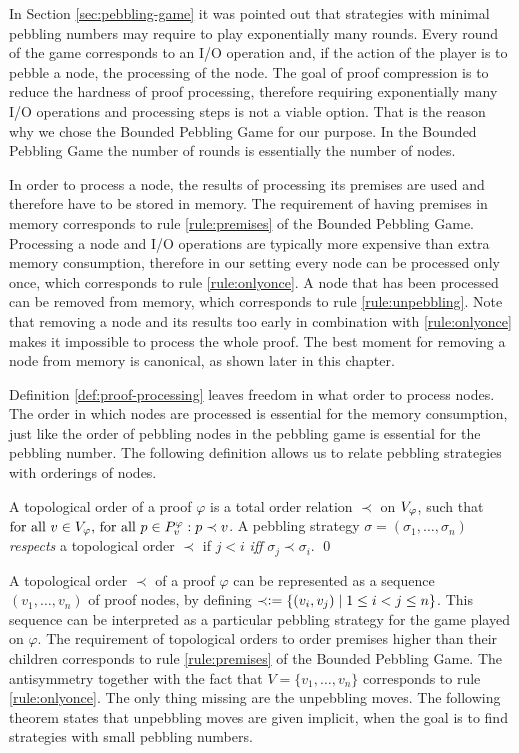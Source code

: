 In Section \ref{sec:pebbling-game} it was pointed out that strategies with minimal pebbling numbers may require to play exponentially many rounds.
Every round of the game corresponds to an I/O operation and, if the action of the player is to pebble a node, the processing of the node.
The goal of proof compression is to reduce the hardness of proof processing, therefore requiring exponentially many I/O operations and processing steps is not a viable option.
That is the reason why we chose the Bounded Pebbling Game for our purpose.
In the Bounded Pebbling Game the number of rounds is essentially the number of nodes.

In order to process a node, the results of processing its premises are used and therefore have to be stored in memory.
The requirement of having premises in memory corresponds to rule \ref{rule:premises} of the Bounded Pebbling Game. 
Processing a node and I/O operations are typically more expensive than extra memory consumption, therefore in our setting every node can be processed only once, which corresponds to rule \ref{rule:onlyonce}.
A node that has been processed can be removed from memory, which corresponds to rule \ref{rule:unpebbling}.
Note that removing a node and its results too early in combination with \ref{rule:onlyonce} makes it impossible to process the whole proof.
The best moment for removing a node from memory is canonical, as shown later in this chapter.

Definition \ref{def:proof-processing} leaves freedom in what order to process nodes.
The order in which nodes are processed is essential for the memory consumption, just like the order of pebbling nodes in the pebbling game is essential for the pebbling number.
The following definition allows us to relate pebbling strategies with orderings of nodes.

\begin{definition}
\label{def:topological-order}
A topological order of a proof $\varphi$ is a total order relation $\prec$ on $V_{\varphi}$, such that 
$\text{for all } v \in V_{\varphi} \text{, for all } p \in P_{v}^{\varphi}:
p \prec v$.
A pebbling strategy $\sigma = (\sigma_1,\ldots,\sigma_n)$ \emph{respects} a topological order $\prec$ if $j < i$ \emph{iff} $\sigma_j \prec \sigma_i$.
\qed
\end{definition}

A topological order $\prec$ of a proof $\varphi$ can be represented as a sequence $(v_1,\dots,v_n)$ of proof nodes, by defining $\prec \mathrel{\mathop:}= \{(v_i,v_j) \mid 1 \leq i < j \leq n\}$. 
This sequence can be interpreted as a particular pebbling strategy for the game played on $\varphi$.
The requirement of topological orders to order premises higher than their children corresponds to rule \ref{rule:premises} of the Bounded Pebbling Game.
The antisymmetry together with the fact that $V = \{v_1,\dots,v_n\}$ corresponds to rule \ref{rule:onlyonce}.
The only thing missing are the unpebbling moves.
The following theorem states that unpebbling moves are given implicit, when the goal is to find strategies with small pebbling numbers.

